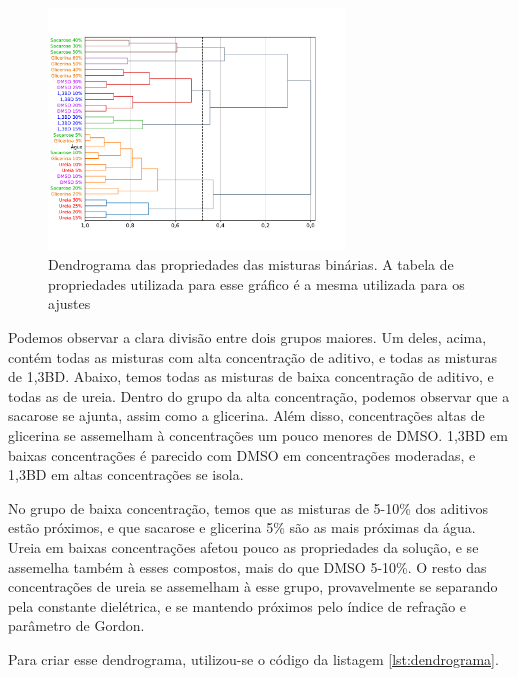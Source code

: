		\begin{figure}[h]
			\centering
			\includegraphics[width=0.7\textwidth]{imagens/propriedades/dendrograma}
			\caption{Dendrograma das propriedades das misturas binárias. A tabela de propriedades utilizada para esse gráfico é a mesma utilizada para os ajustes}
			\label{fig:dendrograma}
		\end{figure}
		
		Podemos observar a clara divisão entre dois grupos maiores. Um deles, acima, contém todas as misturas com alta concentração de aditivo, e todas as misturas de 1,3BD. Abaixo, temos todas as misturas de baixa concentração de aditivo, e todas as de ureia. Dentro do grupo da alta concentração, podemos observar que a sacarose se ajunta, assim como a glicerina. Além disso, concentrações altas de glicerina se assemelham à concentrações um pouco menores de DMSO. 1,3BD em baixas concentrações é parecido com DMSO em concentrações moderadas, e 1,3BD em altas concentrações se isola.
		
		No grupo de baixa concentração, temos que as misturas de 5-10\% dos aditivos estão próximos, e que sacarose e glicerina 5\% são as mais próximas da água. Ureia em baixas concentrações afetou pouco as propriedades da solução, e se assemelha também à esses compostos, mais do que DMSO 5-10\%. O resto das concentrações de ureia se assemelham à esse grupo, provavelmente se separando pela constante dielétrica, e se mantendo próximos pelo índice de refração e parâmetro de Gordon.
		
		Para criar esse dendrograma, utilizou-se o código da listagem \ref{lst:dendrograma}.
		
		\begin{listing}[h]
			\inputminted{python}{./python/dendrograma.py}
			\caption{Código utilizado para criar o dendrograma da figura \ref{fig:dendrograma}}
			\label{lst:dendrograma}
		\end{listing}
		\FloatBarrier


